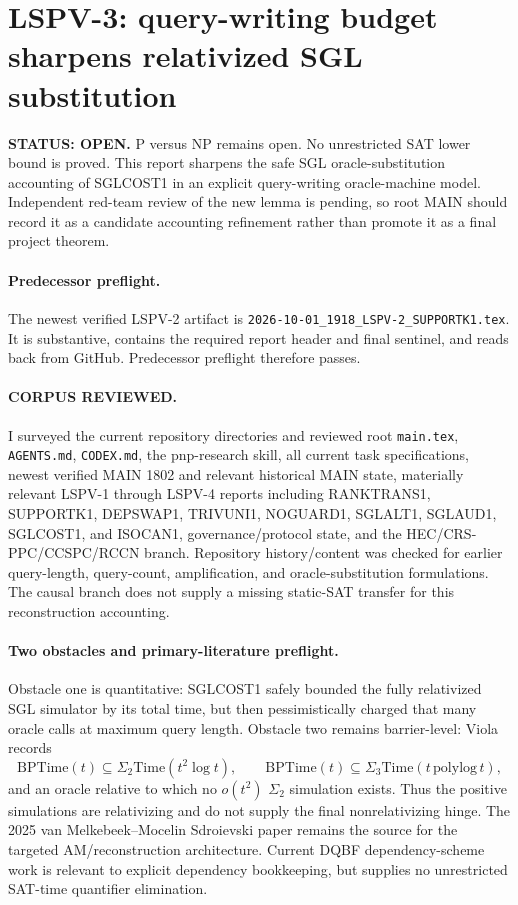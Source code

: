 \documentclass[11pt]{article}
\begin{document}
\section*{LSPV-3: query-writing budget sharpens relativized SGL substitution}

\textbf{STATUS: OPEN.} P versus NP remains open. No unrestricted SAT lower bound is proved. This report sharpens the safe SGL oracle-substitution accounting of SGLCOST1 in an explicit query-writing oracle-machine model. Independent red-team review of the new lemma is pending, so root MAIN should record it as a candidate accounting refinement rather than promote it as a final project theorem.

\paragraph{Predecessor preflight.}
The newest verified LSPV-2 artifact is \texttt{2026-10-01\_1918\_LSPV-2\_SUPPORTK1.tex}. It is substantive, contains the required report header and final sentinel, and reads back from GitHub. Predecessor preflight therefore passes.

\paragraph{CORPUS REVIEWED.}
I surveyed the current repository directories and reviewed root \texttt{main.tex}, \texttt{AGENTS.md}, \texttt{CODEX.md}, the pnp-research skill, all current task specifications, newest verified MAIN 1802 and relevant historical MAIN state, materially relevant LSPV-1 through LSPV-4 reports including RANKTRANS1, SUPPORTK1, DEPSWAP1, TRIVUNI1, NOGUARD1, SGLALT1, SGLAUD1, SGLCOST1, and ISOCAN1, governance/protocol state, and the HEC/CRS-PPC/CCSPC/RCCN branch. Repository history/content was checked for earlier query-length, query-count, amplification, and oracle-substitution formulations. The causal branch does not supply a missing static-SAT transfer for this reconstruction accounting.

\paragraph{Two obstacles and primary-literature preflight.}
Obstacle one is quantitative: SGLCOST1 safely bounded the fully relativized SGL simulator by its total time, but then pessimistically charged that many oracle calls at maximum query length. Obstacle two remains barrier-level: Viola records
\[
\mathrm{BPTime}(t)\subseteq\Sigma_2\mathrm{Time}(t^2\log t),
\qquad
\mathrm{BPTime}(t)\subseteq\Sigma_3\mathrm{Time}(t\,\mathrm{polylog}\,t),
\]
and an oracle relative to which no \(o(t^2)\) \(\Sigma_2\) simulation exists. Thus the positive simulations are relativizing and do not supply the final nonrelativizing hinge. The 2025 van Melkebeek--Mocelin Sdroievski paper remains the source for the targeted AM/reconstruction architecture. Current DQBF dependency-scheme work is relevant to explicit dependency bookkeeping, but supplies no unrestricted SAT-time quantifier elimination.
\end{document}
